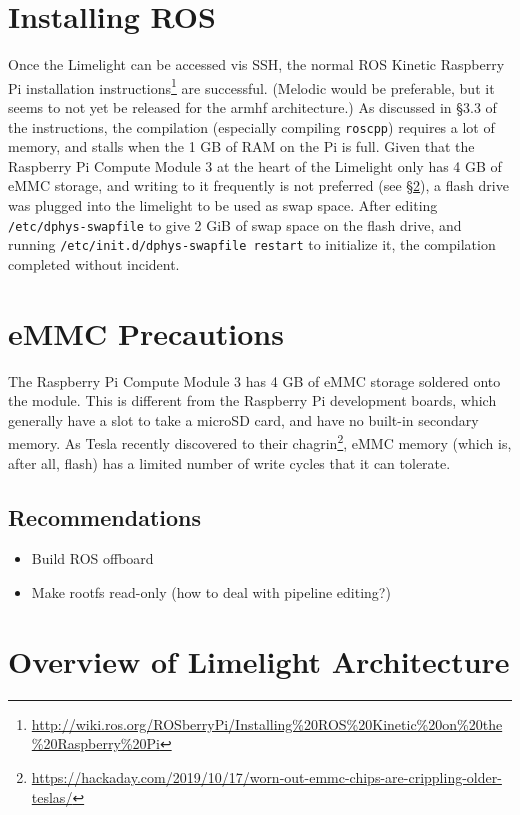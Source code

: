 \documentclass{article}
\begin{document}
\section{Installing ROS}
Once the Limelight can be accessed vis SSH, the normal ROS Kinetic Raspberry Pi installation instructions\footnote{\url{http://wiki.ros.org/ROSberryPi/Installing\%20ROS\%20Kinetic\%20on\%20the\%20Raspberry\%20Pi}} are successful. (Melodic would be preferable, but it seems to not yet be released for the armhf architecture.) As discussed in \S 3.3 of the instructions, the compilation (especially compiling \texttt{roscpp}) requires a lot of memory, and stalls when the 1 GB of RAM on the Pi is full. Given that the Raspberry Pi Compute Module 3 at the heart of the Limelight only has 4 GB of eMMC storage, and writing to it frequently is not preferred (see \S\ref{sec:emmc}), a flash drive was plugged into the limelight to be used as swap space. After editing \texttt{/etc/dphys-swapfile} to give 2 GiB of swap space on the flash drive, and running \texttt{/etc/init.d/dphys-swapfile restart} to initialize it, the compilation completed without incident. 

\section{eMMC Precautions}
\label{sec:emmc}
\par The Raspberry Pi Compute Module 3 has 4 GB of eMMC storage soldered onto the module. This is different from the Raspberry Pi development boards, which generally have a slot to take a microSD card, and have no built-in secondary memory. As Tesla recently discovered to their chagrin\footnote{\url{https://hackaday.com/2019/10/17/worn-out-emmc-chips-are-crippling-older-teslas/}}, eMMC memory (which is, after all, flash) has a limited number of write cycles that it can tolerate. 
\subsection{Recommendations}
\begin{itemize}
	\item Build ROS offboard
	\item Make rootfs read-only (how to deal with pipeline editing?)
\end{itemize}

\section{Overview of Limelight Architecture}
\end{document}
